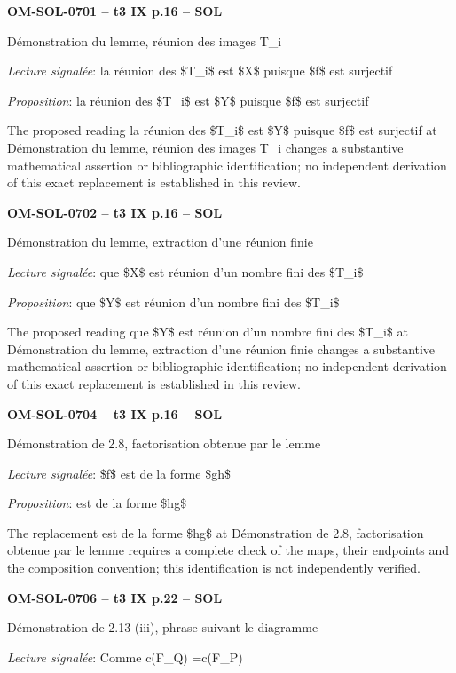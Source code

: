 \par\noindent\textbf{OM-SOL-0701 -- t3 IX p.16 -- SOL}\par
Démonstration du lemme, réunion des images T\_i\par
\emph{Lecture signalée}: la réunion des \$T\_i\$ est \$X\$ puisque \$f\$ est surjectif\par
\emph{Proposition}: la réunion des \$T\_i\$ est \$Y\$ puisque \$f\$ est surjectif\par
The proposed reading la réunion des \$T\_i\$ est \$Y\$ puisque \$f\$ est surjectif at Démonstration du lemme, réunion des images T\_i changes a substantive mathematical assertion or bibliographic identification; no independent derivation of this exact replacement is established in this review.\par
\par\noindent\textbf{OM-SOL-0702 -- t3 IX p.16 -- SOL}\par
Démonstration du lemme, extraction d'une réunion finie\par
\emph{Lecture signalée}: que \$X\$ est réunion d'un nombre fini des \$T\_i\$\par
\emph{Proposition}: que \$Y\$ est réunion d'un nombre fini des \$T\_i\$\par
The proposed reading que \$Y\$ est réunion d'un nombre fini des \$T\_i\$ at Démonstration du lemme, extraction d'une réunion finie changes a substantive mathematical assertion or bibliographic identification; no independent derivation of this exact replacement is established in this review.\par
\par\noindent\textbf{OM-SOL-0704 -- t3 IX p.16 -- SOL}\par
Démonstration de 2.8, factorisation obtenue par le lemme\par
\emph{Lecture signalée}: \$f\$ est de la forme \$gh\$\par
\emph{Proposition}: est de la forme \$hg\$\par
The replacement est de la forme \$hg\$ at Démonstration de 2.8, factorisation obtenue par le lemme requires a complete check of the maps, their endpoints and the composition convention; this identification is not independently verified.\par
\par\noindent\textbf{OM-SOL-0706 -- t3 IX p.22 -- SOL}\par
Démonstration de 2.13 (iii), phrase suivant le diagramme\par
\emph{Lecture signalée}: Comme c(F\_Q) =\allowbreak  c(F\_P)\par
